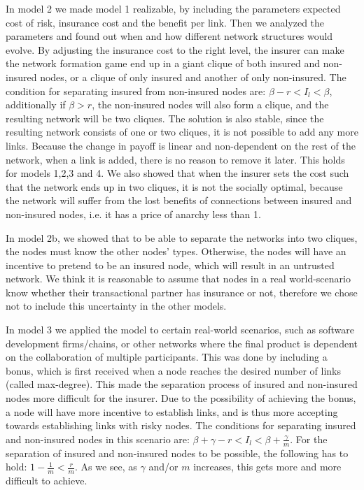 In model 2 we made model 1 realizable, by including the parameters expected cost of risk, insurance cost and the benefit per link. Then we analyzed the parameters and found out when and how different network structures would evolve. By adjusting the insurance cost to the right level, the insurer can make the network formation game end up in a giant clique of both insured and non-insured nodes, or a clique of only insured and another of only non-insured. The condition for separating insured from non-insured nodes are: $\beta-r<I_{l}<\beta$, additionally if $\beta>r$, the non-insured nodes will also form a clique, and the resulting network will be two cliques. The solution is also stable, since the resulting network consists of one or two cliques, it is not possible to add any more links. Because the change in payoff is linear and non-dependent on the rest of the network, when a link is added, there is no reason to remove it later. This holds for models 1,2,3 and 4.
We also showed that when the insurer sets the cost such that the network ends up in two cliques, it is not the socially optimal, because the network will suffer from the lost benefits of connections between insured and non-insured nodes, i.e. it has a price of anarchy less than 1.


In model 2b, we showed that to be able to separate the networks into two cliques, the nodes must know the other nodes' types. Otherwise, the nodes will have an incentive to pretend to be an insured node, which will result in an untrusted network. We think it is reasonable to assume that nodes in a real world-scenario know whether their transactional partner has insurance or not, therefore we chose not to include this uncertainty in the other models.

In model 3 we applied the model to certain real-world scenarios, such as software development firms/chains, or other networks where the final product is dependent on the collaboration of multiple participants.
This was done by including a bonus, which is first received when a node reaches the desired number of links (called max-degree). This made the separation process of insured and non-insured nodes more difficult for the insurer. Due to the possibility of achieving the bonus, a node will have more incentive to establish links, and is thus more accepting towards establishing links with risky nodes. The conditions for separating insured and non-insured nodes in this scenario are: $\beta+\gamma-r<I_{l}<\beta+\frac{\gamma}{m}$. For the separation of insured and non-insured nodes to be possible, the following has to hold: $1-\frac{1}{m}<\frac{r}{m}$. As we see, as $\gamma$ and/or $m$ increases, this gets more and more difficult to achieve. 

